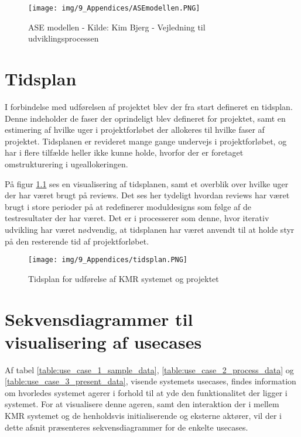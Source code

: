 \begin{appendices}
\begin{figure}[H]
	\centering
	\texttt{[image: img/9\_Appendices/ASEmodellen.PNG]}
	\caption[ASE modellen]{ASE modellen - Kilde: Kim Bjerg - Vejledning til udviklingsprocessen}
	\label{fig:asemodellen}
\end{figure}

\pagebreak

\chapter{Tidsplan} \label{appendix::tidsplan}
I forbindelse med udførelsen af projektet blev der fra start defineret en tidsplan. Denne indeholder de faser der oprindeligt blev defineret for projektet, samt en estimering af hvilke uger i projektforløbet der allokeres til hvilke faser af projektet. Tidsplanen er revideret mange gange undervejs i projektforløbet, og har i flere tilfælde heller ikke kunne holde, hvorfor der er foretaget omstrukturering i ugeallokeringen.

På figur \ref{fig:tidsplan} ses en visualisering af tidsplanen, samt et overblik over hvilke uger der har været brugt på reviews. Det ses her tydeligt hvordan reviews har været brugt i store perioder på at redefinerer moduldesigns som følge af de testresultater der har været. Det er i processerer som denne, hvor iterativ udvikling har været nødvendig, at tidsplanen har været anvendt til at holde styr på den resterende tid af projektforløbet.  

\begin{figure}[H]
	\centering
	\texttt{[image: img/9\_Appendices/tidsplan.PNG]}
	\caption[Tidsplan]{Tidsplan for udførelse af KMR systemet og projektet}
	\label{fig:tidsplan}
\end{figure}

\pagebreak

\chapter{Sekvensdiagrammer til visualisering af usecases} \label{appendix::sequence_usecases}

Af tabel \ref{table:use_case_1_sample_data}, \ref{table:use_case_2_process_data} og \ref{table:use_case_3_present_data}, visende systemets usecases, findes information om hvorledes systemet agerer i forhold til at yde den funktionalitet der ligger i systemet. For at visualisere denne ageren, samt den interaktion der i mellem KMR systemet og de henholdsvis initialiserende og eksterne aktører, vil der i dette afsnit præsenteres sekvensdiagrammer for de enkelte usecases. 


\end{appendices}
